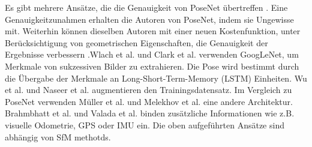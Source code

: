 Es gibt mehrere Ansätze, die die Genauigkeit von PoseNet übertreffen . Eine Genauigkeitzunahmen erhalten die Autoren von PoseNet, indem sie Ungewisse mit. Weiterhin können dieselben Autoren mit einer neuen Kostenfunktion, unter Berücksichtigung von geometrischen Eigenschaften, die Genauigkeit der Ergebnisse verbessern \cite{kendallGeometricLossFunctions2017}.Wlach et al. \cite{walchImagebasedLocalizationUsing2016} und Clark et al. \cite{clarkVidLocDeepSpatioTemporal2017} verwenden GoogLeNet, um Merkmale von sukzessiven Bilder zu extrahieren. Die Pose wird bestimmt durch die Übergabe der Merkmale an Long-Short-Term-Memory (LSTM) \cite{hochreiterLongShortTermMemory1997a} Einheiten.
Wu et al.\cite{wuDelvingDeeperConvolutional2017}  und  Naseer et al. \cite{naseerDeepRegressionMonocular2017} augmentieren den Trainingsdatensatz. Im Vergleich zu PoseNet verwenden Müller et al. \cite{mullerSQUEEZEPOSENETIMAGEBASED2017} und Melekhov et al.\cite{melekhovImageBasedLocalizationUsing2017} eine andere Architektur. Brahmbhatt et al. \cite{brahmbhattGeometryAwareLearningMaps2018} und Valada et al. \cite{valadaDeepAuxiliaryLearning2018, valadaIncorporatingSemanticGeometric} binden zusätzliche Informationen wie z.B. visuelle Odometrie, GPS oder IMU ein.
Die oben aufgeführten Ansätze sind abhängig von SfM methotds.



% 
